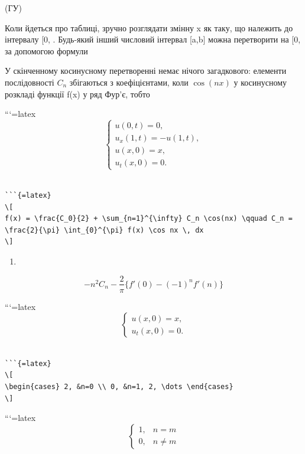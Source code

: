 \documentclass[
  ukrainian,
]{article}
\providecommand{\tightlist}{%
  \setlength{\itemsep}{0pt}\setlength{\parskip}{0pt}}
\begin{document}
(ГУ)

Коли йдеться про таблиці, зручно розглядати змінну x як таку, що
належить до інтервалу {[}0,\pi{]} . Будь-який інший числовий інтервал
{[}a,b{]} можна перетворити на {[}0,\pi{]} за допомогою формули

У скінченному косинусному перетворенні немає нічого загадкового:
елементи послідовності \(C_n\) збігаються з коефіцієнтами, коли
\(\cos{(nx)}\) у косинусному розкладі функції f(x) у ряд Фур'є, тобто

```{=latex}
\[
\begin{cases} u(0, t) = 0, \\ u_x(1, t) = -u(1, t), \\ u(x, 0) = x, \\ u_t(x, 0) = 0. \end{cases}
\]

\begin{verbatim}

```{=latex}
\[
f(x) = \frac{C_0}{2} + \sum_{n=1}^{\infty} C_n \cos(nx) \qquad C_n = \frac{2}{\pi} \int_{0}^{\pi} f(x) \cos nx \, dx
\]
\end{verbatim}

\begin{enumerate}
\def\labelenumi{\arabic{enumi}.}
\tightlist
\item
\end{enumerate}

\[
-n^{2}C_{n} - \frac{2}{\pi} \{f'(0) - (-1)^{n} f'(n)\}
\]

```{=latex}
\[
\begin{cases} u(x, 0) = x, \\ u_t(x, 0) = 0. \end{cases}
\]

\begin{verbatim}

```{=latex}
\[
\begin{cases} 2, &n=0 \\ 0, &n=1, 2, \dots \end{cases}
\]
\end{verbatim}

```{=latex}
\[
\begin{cases} 1, & n=m \\ 0, & n\neq m \end{cases}
\]
\end{document}
